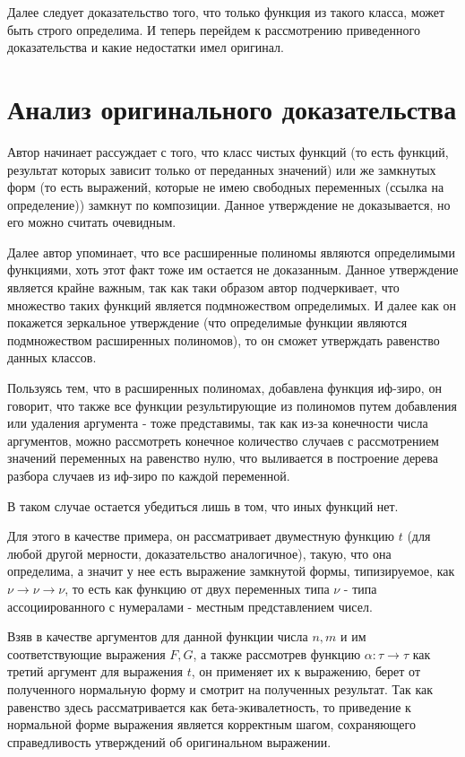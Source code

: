\documentclass[times,specification,annotation]{itmo-student-thesis}
\begin{document}
    Далее следует доказательство того, что только функция из такого класса,
    может быть строго определима. И теперь перейдем к рассмотрению приведенного
    доказательства и какие недостатки имел оригинал.  


\todo
\section{Анализ оригинального доказательства}
    Автор начинает рассуждает с того, что класс чистых функций (то есть функций, результат которых зависит только от переданных значений) или же замкнутых форм (то есть выражений, которые не имею свободных переменных (ссылка на определение)) замкнут по композиции. Данное утверждение не доказывается, но его можно считать очевидным.
    
    Далее автор упоминает, что все расширенные полиномы являются определимыми функциями, хоть этот факт тоже им остается не доказанным. Данное утверждение является крайне важным, так как таки образом автор подчеркивает, что множество таких функций является подмножеством определимых. И далее как он покажется зеркальное утверждение (что определимые функции являются подмножеством расширенных полиномов), то он сможет утверждать равенство данных классов. 
    
    Пользуясь тем, что в расширенных полиномах, добавлена функция иф-зиро, он говорит, что также все функции результирующие из полиномов путем добавления или удаления
    аргумента - тоже представимы, так как из-за конечности числа аргументов, можно рассмотреть конечное количество случаев с рассмотрением значений переменных на равенство нулю, что выливается в построение дерева разбора случаев из иф-зиро по каждой переменной.

    В таком случае остается убедиться лишь в том, что иных функций нет.
    
    Для этого в качестве примера, он рассматривает двуместную функцию \(t\) (для любой другой мерности, доказательство аналогичное), такую, что она определима, а значит у нее есть выражение замкнутой формы, типизируемое, как $\nu \rightarrow \nu \rightarrow \nu $, то есть как функцию от двух переменных типа \(\nu\) - типа ассоциированного с нумералами - местным представлением чисел.
    
    Взяв в качестве аргументов для данной функции числа \(n, m\) и им соответствующие выражения \(F, G\), а также рассмотрев функцию \(\alpha : \tau \rightarrow \tau\) как третий аргумент для выражения \(t\), он применяет их к выражению, берет от полученного нормальную форму и смотрит на полученных результат. Так как равенство здесь рассматривается как бета-экивалетность, то приведение к нормальной форме выражения является корректным шагом, сохраняющего справедливость утверждений об оригинальном выражении.
    
\end{document}
